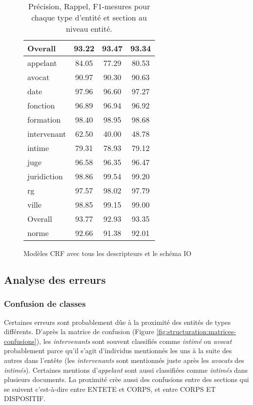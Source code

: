 \begin{table}[!h]
\begin{subfigure}[t]{0.45\textwidth}
\begin{tabular}{|l|ccc|}
Overall &   93.22 &  93.47 &  93.34 \\\hline
 \noalign{\smallskip}\hline\noalign{\smallskip}
appelant &   84.05 &  77.29 &  80.53 \\
avocat  &   90.97 &  90.30 &  90.63 \\
date    &   97.96 &  96.60 &  97.27 \\
fonction &   96.89 &  96.94 &  96.92 \\
formation &   98.40 &  98.95 &  98.68 \\
intervenant &   62.50 &  40.00 &  48.78 \\
intime  &   79.31 &  78.93 &  79.12 \\
juge    &   96.58 &  96.35 &  96.47 \\
juridiction &   98.86 &  99.54 &  99.20 \\
rg      &   97.57 &  98.02 &  97.79 \\
ville   &   98.85 &  99.15 &  99.00 \\\hline
Overall &   93.77 &  92.93 &  93.35 \\\hline
 \noalign{\smallskip}\hline\noalign{\smallskip}
norme   &   92.66 &  91.38 &  92.01 \\\hline
\end{tabular}
\caption{Modèles CRF avec tous les descripteurs et le schéma IO}\label{tab:structuration:perf-detail-entity-crf}
\end{subfigure} 
\caption{Précision, Rappel, F1-mesures pour chaque type d'entité et section au niveau entité.}\label{tab:structuration:perf-detail-entity}
\end{table}


\subsection{Analyse des erreurs}
\subsubsection{Confusion de classes}
Certaines erreurs sont probablement dûe à la proximité des entités de types différents. D'après la matrice de confusion (Figure \ref{fig:structuration:matrices-confusions}), les \textit{intervenants} sont souvent classifiés comme \textit{intimé} ou \textit{avocat} probablement parce qu'il s'agit d'individus mentionnés les uns à la suite des autres dans l'entête (les \textit{intervenants} sont mentionnés juste après les \textit{avocats} des \textit{intimés}). Certaines mentions d'\textit{appelant} sont aussi classifiées comme \textit{intimés} dans plusieurs documents. La proximité crèe aussi des confusions entre des sections qui se suivent c'est-à-dire entre ENTETE et CORPS, et entre CORPS ET DISPOSITIF.  


